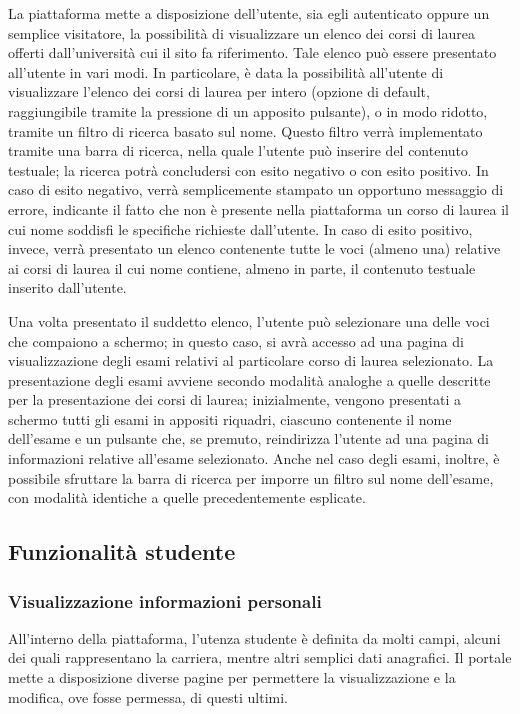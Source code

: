 \documentclass [a4paper,11pt]{book}
\begin{document}
La piattaforma mette a disposizione dell'utente, sia egli autenticato oppure un semplice visitatore, la possibilità di visualizzare un elenco dei corsi di laurea offerti dall'università cui il sito fa riferimento. Tale elenco può essere presentato all'utente in vari modi. In particolare, è data la possibilità all'utente di visualizzare l'elenco dei corsi di laurea per intero (opzione di default, raggiungibile tramite la pressione di un apposito pulsante), o in modo ridotto, tramite un filtro di ricerca basato sul nome. Questo filtro verrà implementato tramite una barra di ricerca, nella quale l'utente può inserire del contenuto testuale; la ricerca potrà concludersi con esito negativo o con esito positivo. In caso di esito negativo, verrà semplicemente stampato un opportuno messaggio di errore, indicante il fatto che non è presente nella piattaforma un corso di laurea il cui nome soddisfi le specifiche richieste dall'utente. In caso di esito positivo, invece, verrà presentato un elenco contenente tutte le voci (almeno una) relative ai corsi di laurea il cui nome contiene, almeno in parte, il contenuto testuale inserito dall'utente.

Una volta presentato il suddetto elenco, l'utente può selezionare una delle voci che compaiono a schermo; in questo caso, si avrà accesso ad una pagina di visualizzazione degli esami relativi al particolare corso di laurea selezionato. La presentazione degli esami avviene secondo modalità analoghe a quelle descritte per la presentazione dei corsi di laurea; inizialmente, vengono presentati a schermo tutti gli esami in appositi riquadri, ciascuno contenente il nome dell'esame e un pulsante che, se premuto, reindirizza l'utente ad una pagina di informazioni relative all'esame selezionato. Anche nel caso degli esami, inoltre, è possibile sfruttare la barra di ricerca per imporre un filtro sul nome dell'esame, con modalità identiche a quelle precedentemente esplicate.

\medskip

\subsection{Funzionalità studente}

\subsubsection{Visualizzazione informazioni personali}

All'interno della piattaforma, l'utenza studente è definita da molti campi, alcuni dei quali rappresentano la carriera, mentre altri semplici dati anagrafici. Il portale mette a disposizione diverse pagine per permettere la visualizzazione e la modifica, ove fosse permessa, di questi ultimi.
\end{document}

